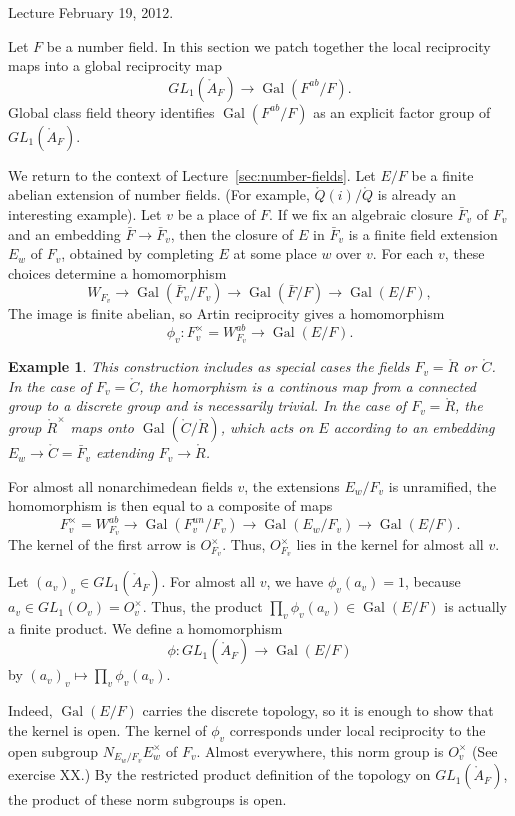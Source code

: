 \documentclass{amsart}
\newtheorem{example}[exercise]{Example}
\def\op#1{{\operatorname{#1}}}
\def\CC{\ring{C}}
\def\RR{\ring{R}}
\def\QQ{\ring{Q}}
\def\AA{\ring{A}}
\def\oG{\op{Gal}}
\def\bF{{\bar F}}
\begin{document}
Lecture February 19, 2012.


Let $F$ be a number field.
In this section we patch together the local reciprocity maps into 
a global reciprocity map
\[
GL_1(\AA_F) \to \oG(F^{ab}/F).
\]
Global class field theory identifies $\oG(F^{ab}/F)$ as
an explicit factor group of $GL_1(\AA_F)$.

We return to the context of Lecture~\ref{sec:number-fields}.
Let $E/F$ be a finite abelian extension of number fields.  (For example, $\QQ(i)/\QQ$
is already an interesting example).  Let $v$ be a place of $F$.  If we fix an algebraic
closure $\bF_v$ of $F_v$ and an embedding $\bF\to \bF_v$, then the closure of
$E$ in $\bF_v$ is a finite field extension $E_w$ of $F_v$, obtained by completing
$E$ at some place $w$ over $v$.
For each $v$, these choices determine a homomorphism
\[
W_{F_v} \to \oG(\bF_v/F_v) \to \oG(\bF/F)\to \oG(E/F),
\]
The image is finite abelian, so Artin reciprocity gives a homomorphism
\[
\phi_v:F_v^\times = W^{ab}_{F_v} \to \oG(E/F).
\]

\begin{example}
This construction includes as special cases the fields $F_v = \RR$ or $\CC$.
In the case of $F_v=\CC$, the homorphism is a continous map from a connected
group to a discrete group and is necessarily trivial.  In the case of $F_v = \RR$, the
group $\RR^\times$ maps onto $\oG(\CC/\RR)$, which acts on $E$ according to an
embedding $E_w\to \CC=\bF_v$ extending $F_v\to\RR$.
\end{example}

For almost all nonarchimedean fields $v$, 
the extensions $E_w/F_v$ is unramified,  the homomorphism is
then equal to a composite of maps
\[
F_v^\times = W_{F_v}^{ab} \to \oG(F^{un}_v/F_v) \to \oG(E_w/F_v) \to \oG(E/F).
\]
The kernel of the first arrow is $O_{F_v}^\times$.  Thus, $O_{F_v}^\times$ lies in
the kernel for almost all $v$.

Let $(a_v)_v\in GL_1(\AA_F)$.  For almost all $v$, we have
$\phi_v(a_v) = 1$, because $a_v\in GL_1(O_v) = O_v^\times$.  Thus, the product
$\prod_v \phi_v(a_v) \in \oG(E/F)$ is actually a finite product.  We define a homomorphism
\[
\phi: GL_1(\AA_F)\to \oG(E/F)
\]
by $(a_v)_v\mapsto \prod_v\phi_v(a_v)$.

 Indeed, $\oG(E/F)$
carries the discrete topology, so it is enough to show that the kernel is open.  The
kernel of $\phi_v$ corresponds under local reciprocity to the open subgroup
$N_{E_w/F_v} E_w^\times$ of $F_v$.  Almost everywhere, this norm group is $O_v^\times$
(See exercise XX.)  By the restricted product 
definition of the topology on $GL_1(\AA_F)$, the product of these norm subgroups is open.
\end{document}

